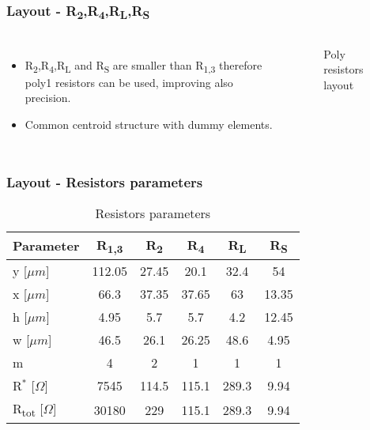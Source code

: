 \begin{frame}
\frametitle{Layout - R\textsubscript{2},R\textsubscript{4},R\textsubscript{L},R\textsubscript{S}}
\begin{columns}
	\begin{itemize}	
	\item R\textsubscript{2},R\textsubscript{4},R\textsubscript{L} and R\textsubscript{S} are smaller than R\textsubscript{1,3} therefore poly1 resistors can be used, improving also precision. 
	\item Common centroid structure with dummy elements.
	\end{itemize}
	\begin{figure}[H]
		\centering
		
		\vfill
		\hfil
		\caption{Poly resistors layout}
	\end{figure}
\end{columns}
\end{frame}

\begin{frame}
	\frametitle{Layout - Resistors parameters}
	\begin{table} [h]
		\label{tab:specs}
		\caption{Resistors parameters}
		\centering	
		\begin{tabular}{lccccc} 
			\toprule 
			Parameter & R\textsubscript{1,3}& R\textsubscript{2} & R\textsubscript{4}&R\textsubscript{L}&R\textsubscript{S} \\ 
			\midrule
			y [$\mu m$] &112.05&27.45&20.1&32.4&54\\
			x [$\mu m$] &66.3&37.35&37.65&63&13.35\\
			h [$\mu m$] &4.95&5.7&5.7&4.2&12.45\\
			w [$\mu m$] &46.5&26.1&26.25&48.6&4.95\\
			m			&4&2&1&1&1\\
			R$^*$ [$\Omega$] & 7545&114.5&115.1&289.3&9.94\\
			R\textsubscript{tot} [$\Omega$]&30180&229&115.1&289.3&9.94\\
			\bottomrule 
		\end{tabular}	
	\end{table}

\end{frame}

